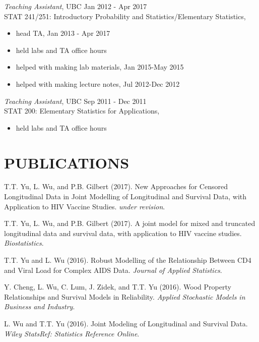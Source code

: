 \documentclass[margin]{res}
\begin{document}
\begin{resume}
{\sl Teaching Assistant}, UBC \hfill Jan 2012 - Apr 2017 \\
                STAT 241/251: Introductory Probability and Statistics/Elementary Statistics, \\
                 \begin{itemize}  \itemsep -2pt %
                 \item head TA, Jan 2013 - Apr 2017
                 \item held labs and TA office hours
                 \item helped with making lab materials, Jan 2015-May 2015
                 \item helped with making lecture notes, Jul 2012-Dec 2012                 
                \end{itemize}
 
 {\sl Teaching Assistant}, UBC \hfill Sep 2011 - Dec 2011 \\
                STAT 200: Elementary Statistics for Applications, 
                \begin{itemize} \itemsep -2pt %
                    \item held labs and TA office hours
                \end{itemize}

\section{PUBLICATIONS} %

T.T. Yu, L. Wu, and P.B. Gilbert (2017). New Approaches for Censored Longitudinal Data in Joint Modelling of Longitudinal and Survival Data, with Application to HIV Vaccine Studies. {\em under revision}.

T.T. Yu, L. Wu, and P.B. Gilbert (2017). A joint model for mixed and truncated longitudinal data and survival data, with application to HIV vaccine studies. {\em Biostatistics}. 

T.T. Yu and L. Wu (2016). Robust Modelling of the Relationship Between CD4 and Viral Load for Complex AIDS Data. {\em Journal of Applied Statistics}.

Y. Cheng, L. Wu, C. Lum, J. Zidek, and T.T. Yu (2016).  Wood Property Relationships and Survival Models in Reliability. {\em Applied Stochastic Models in Business and Industry}.

L. Wu and T.T. Yu (2016).  Joint Modeling of Longitudinal and Survival Data. {\em Wiley StatsRef: Statistics Reference Online}.



\end{resume}
\end{document}
